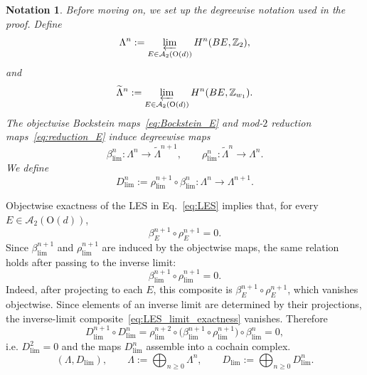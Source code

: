 \documentclass[aps,prx,reprint,superscriptaddress,twocolumn,amsmath,amssymb,amsfonts, nofootinbib]{revtex4-2}
\theoremstyle{apsstyle}
\newtheorem{notation}{Notation}
\begin{document}
\begin{notation}
Before moving on, we set up the degreewise notation used in the proof. Define
\begin{equation}
\Lambda^n := \varprojlim_{E\in\mathcal A_2(\mathrm{O}(d))} H^n(BE,\mathbb Z_2), 
\end{equation}
and
\begin{equation}
\widetilde{\Lambda}^n := \varprojlim_{E\in\mathcal A_2(\mathrm{O}(d))}
H^n(BE,\mathbb Z_{w_1}).
\end{equation}
The objectwise Bockstein maps~\eqref{eq:Bockstein_E} and mod-$2$ reduction maps~\eqref{eq:reduction_E} induce degreewise maps
\begin{equation}
\beta_{\lim}^n: \Lambda^n \longrightarrow \widetilde{\Lambda}^{n+1},\qquad 
\rho_{\lim}^n: \widetilde{\Lambda}^n \longrightarrow \Lambda^n.
\end{equation}
We define
\begin{equation}
D_{\lim}^n := \rho_{\lim}^{n+1}\circ \beta_{\lim}^n:
\Lambda^n \longrightarrow \Lambda^{n+1}.
\end{equation}
\end{notation}
Objectwise exactness of the LES in Eq.~\ref{eq:LES} implies that, for every
$E\in\mathcal A_2(\mathrm{O}(d))$,
\begin{equation}
\beta_E^{n+1}\circ \rho_E^{n+1}=0.
\end{equation}
Since $\beta_{\lim}^{n+1}$ and $\rho_{\lim}^{n+1}$ are induced by the objectwise maps, the same relation holds after passing to the inverse limit:
\begin{equation}
\beta_{\lim}^{n+1}\circ \rho_{\lim}^{n+1}=0.
\label{eq:LES_limit_exactness}
\end{equation}
Indeed, after projecting to each $E$, this composite is $\beta_E^{n+1}\circ \rho_E^{n+1}$,
which vanishes objectwise. Since elements of an inverse limit are determined by their projections, the inverse-limit composite~\eqref{eq:LES_limit_exactness} vanishes.
Therefore
\begin{equation}
D_{\lim}^{n+1}\circ D_{\lim}^{n} = \rho_{\lim}^{n+2} \circ
\bigl(\beta_{\lim}^{n+1}\circ \rho_{\lim}^{n+1}\bigr) \circ \beta_{\lim}^{n} = 0,
\end{equation}
i.e. $D_{\lim}^{2}=0$ and the maps $D_{\lim}^{n}$ assemble into a cochain complex.
\begin{equation}
\label{eq:Lambda_complex}
(\Lambda,D_{\lim}), \qquad \Lambda:=\bigoplus_{n\geq 0}\Lambda^n, \qquad
D_{\lim}:=\bigoplus_{n\geq 0}D_{\lim}^n.
\end{equation}
\end{document}
